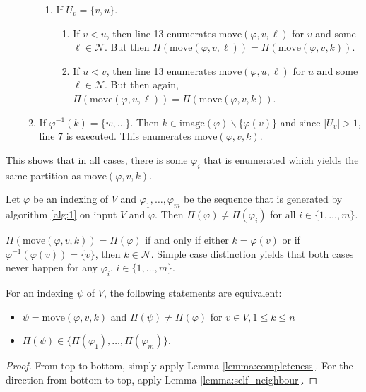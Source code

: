 \documentclass[11pt,a4paper]{article}
\numberwithin{equation}{section}
\newcommand{\idx}{\varphi}
\newcommand{\move}{\mathrm{move}}
\newcommand{\image}{\mathrm{image}}
\begin{document}
\begin{appendixproof}
\begin{enumerate}
\begin{enumerate}
\begin{enumerate}
                \item If $U_v = \{v,u\}$. 
                \begin{enumerate}
                    \item If $v < u$, then line 13 enumerates $\move(\idx,v,\ell)$ for $v$ and some $\ell \in \mathcal{N}$. But then $\Pi(\move(\idx,v,\ell)) = \Pi(\move(\idx,v,k))$.
                    \item If $u < v$, then line 13 enumerates $\move(\idx,u,\ell)$ for $u$ and some $\ell \in \mathcal{N}$. But then again, $\Pi(\move(\idx,u,\ell)) = \Pi(\move(\idx,v,k))$.
                \end{enumerate} 
            \end{enumerate}
            \item If $\idx^{-1}(k) = \{w,\dots\}$. Then $k \in \image(\idx)\backslash \{ \idx(v) \}$ and since $|U_v|>1$, line 7 is executed. This enumerates $\move(\idx,v,k)$.
        \end{enumerate}
    \end{enumerate}
    This shows that in all cases, there is some $\idx_i$ that is enumerated which yields the same partition as $\move(\idx,v,k)$.
\end{appendixproof}

\begin{lemmarep}
    Let $\idx$ be an indexing of $V$ and $\idx_1,\dots,\idx_m$ be the sequence that is generated by algorithm \ref{alg:1} on input $V$ and $\idx$. Then $\Pi(\idx) \neq \Pi(\idx_i)$ for all $i\in \{1,\dots,m\}$. \label{lemma:self_neighbour}
\end{lemmarep}
\begin{appendixproof}
    $\Pi(\move(\idx,v,k)) = \Pi(\idx)$ if and only if either $k=\idx(v)$ or if $\idx^{-1}(\idx(v)) = \{v\}$, then $k \in \mathcal{N}$. Simple case distinction yields that both cases never happen for any $\idx_i$, $i\in \{1,\dots,m\}$.
\end{appendixproof}

\begin{corollary}
    For an indexing $\psi$ of $V$, the following statements are equivalent:
    \begin{itemize}
        \item $\psi = \move(\idx,v,k)$ and $\Pi(\psi)\neq \Pi(\idx)$ for $v \in V, 1\leq k \leq n$
        \item $\Pi(\psi) \in \{\Pi(\idx_1),\dots,\Pi(\idx_m)\}$.
    \end{itemize}
\end{corollary}
\begin{proof}
    From top to bottom, simply apply Lemma \ref{lemma:completeness}. For the direction from bottom to top, apply Lemma \ref{lemma:self_neighbour}.
\end{proof}


%
\end{document}
